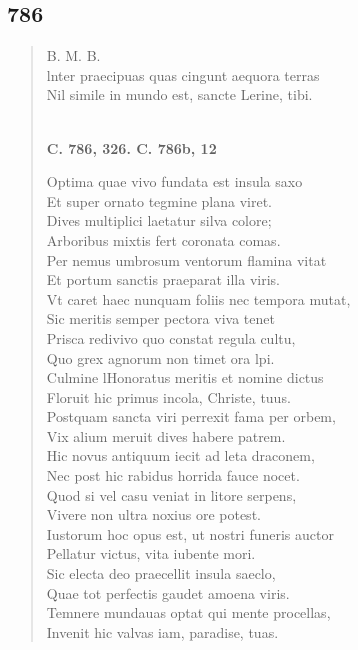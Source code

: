 \documentclass[11pt, a4paper]{report}
\begin{document}
            \subsection*{786}
      \begin{verse}
      B. M. B. \\ lnter praecipuas quas cingunt aequora terras \\ Nil simile in mundo est, sancte Lerine, tibi. \\ 
        ﻿\pagebreak 
    \begin{center} \textbf{C. 786, 326. C. 786b, 12} \end{center} \marginpar{[266]} Optima quae vivo fundata est insula saxo \\ Et super ornato tegmine plana viret. \\ Dives multiplici laetatur silva colore; \\ Arboribus mixtis fert coronata comas. \\ Per nemus umbrosum ventorum flamina vitat \\ Et portum sanctis praeparat illa viris. \\ Vt caret haec nunquam foliis nec tempora mutat, \\ Sic meritis semper pectora  \lbrack viva \rbrack  tenet \\ Prisca redivivo quo constat regula cultu, \\ Quo grex agnorum non timet ora lpi. \\ Culmine lHonoratus meritis et nomine dictus \\ Floruit hic primus incola, Christe, tuus. \\ Postquam sancta viri perrexit fama per orbem, \\ Vix  \lbrack alium \rbrack  meruit dives habere patrem. \\ Hic novus antiquum iecit ad leta draconem, \\ Nec post hic rabidus horrida fauce nocet. \\ Quod si vel casu veniat in litore serpens, \\ Vivere non ultra noxius ore potest. \\ Iustorum hoc opus est, ut nostri funeris auctor \\ Pellatur victus, vita iubente mori. \\ Sic electa deo praecellit insula saeclo, \\ Quae tot perfectis gaudet amoena viris. \\ Temnere mundauas optat qui mente procellas, \\ Invenit hic valvas iam, paradise, tuas. \\ 
      \end{verse}
  
\end{document}
